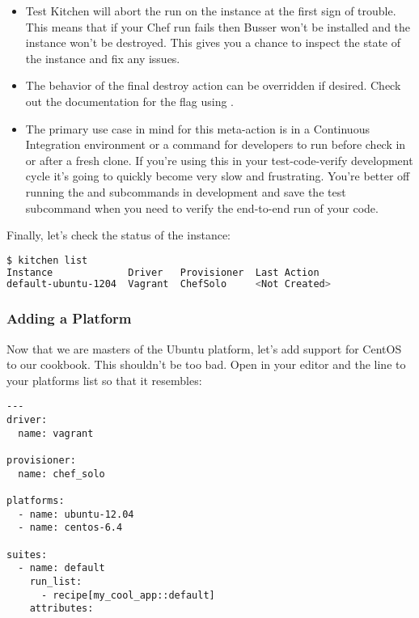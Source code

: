 \begin{itemize}
  \item Test Kitchen will abort the run on the instance at the first sign of trouble. This means that if your Chef run fails then Busser won't be installed and the instance won't be destroyed. This gives you a chance to inspect the state of the instance and fix any issues.
  \item The behavior of the final destroy action can be overridden if desired. Check out the documentation for the  flag using .
  \item The primary use case in mind for this meta-action is in a Continuous Integration environment or a command for developers to run before check in or after a fresh clone. If you're using this in your test-code-verify development cycle it's going to quickly become very slow and frustrating. You're better off running the  and  subcommands in development and save the test subcommand when you need to verify the end-to-end run of your code.
\end{itemize}

Finally, let's check the status of the instance:

\begin{lstlisting}[language=Bash,label=lst:testing-test-kitchen19]
$ kitchen list
Instance             Driver   Provisioner  Last Action
default-ubuntu-1204  Vagrant  ChefSolo     <Not Created>
\end{lstlisting}




\subsubsection{Adding a Platform}

Now that we are masters of the Ubuntu platform, let's add support for CentOS to our cookbook. This shouldn't be too bad. Open  in your editor and the  line to your platforms list so that it resembles:

\begin{lstlisting}[label=lst:testing-test-kitchen20]
---
driver:
  name: vagrant

provisioner:
  name: chef_solo

platforms:
  - name: ubuntu-12.04
  - name: centos-6.4

suites:
  - name: default
    run_list:
      - recipe[my_cool_app::default]
    attributes:
\end{lstlisting}

